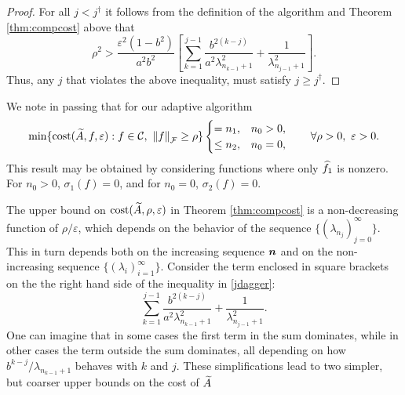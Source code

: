 \documentclass[final]{elsarticle}
\theoremstyle{definition}
\theoremstyle{remark}
\begin{document}
\begin{proof}
For all $j < j^\dagger$ it follows from the definition of the algorithm and Theorem \ref{thm:compcost} above that 
\begin{equation*}
\rho^2 > \frac{\varepsilon^2(1 - b^2)}{a^2b^2} \left[ \sum_{k=1}^{j-1} \frac{ b^{2(k-j)}}{a^{2}\lambda_{n_{k-1}+1}^2} + \frac{1}{\lambda_{n_{j-1}+1}^2}\right].
\end{equation*}
Thus, any $j$ that violates the above inequality, must satisfy $j \ge j^\dagger$.
\end{proof}

We note in passing that for our adaptive algorithm
\begin{equation*}
 \min \{\cost(\tA,f,\varepsilon) : f \in \cc, \ \norm[\cf]{f} \ge \rho \} 
 \begin{cases} = n_1, & n_0 > 0, \\
 \le n_2, & n_0 = 0, 
 \end{cases}
 \qquad \forall \rho > 0, \ \varepsilon > 0.
\end{equation*}
This result may be obtained by considering functions where only $\widehat{f}_1$ is nonzero.  For $n_0 > 0$, $\sigma_1(f) = 0$, and for $n_0 = 0$, $\sigma_2(f) = 0$.

The upper bound on $\operatorname{cost}(\widetilde{A},\rho,\varepsilon)$ in Theorem \ref{thm:compcost}  is a non-decreasing function of $\rho/\varepsilon$, which depends on the behavior of the sequence $\{(\lambda_{n_j})_{j=0}^\infty\}$.  This in turn depends both on the increasing sequence $\boldsymbol{n}$ and on the non-increasing sequence $\{(\lambda_i)_{i=1}^\infty\}$. Consider the  term enclosed in square brackets on the the right hand side of the inequality in \eqref{jdagger}: \begin{equation} \label{keysum}
\sum_{k=1}^{j-1} \frac{b^{2(k-j)}}{a^2\lambda_{n_{k-1}+1}^2} + \frac{1}{\lambda_{n_{j-1}+1}^2}.
\end{equation}
One can imagine that in some cases the first term in the sum dominates, while in other cases the term outside the sum dominates, all depending on how $b^{k-j}/\lambda_{n_{k-1}+1}$ behaves with $k$ and $j$.  These simplifications lead to two simpler, but coarser upper bounds on the cost of $\widetilde{A}$
\end{document}
